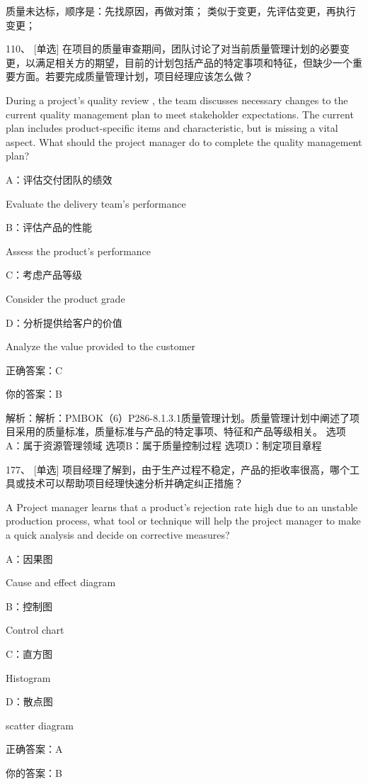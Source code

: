 质量未达标，顺序是：先找原因，再做对策；
类似于变更，先评估变更，再执行变更；



110、 [单选] 在项目的质量审查期间，团队讨论了对当前质量管理计划的必要变更，以满足相关方的期望，目前的计划包括产品的特定事项和特征，但缺少一个重要方面。若要完成质量管理计划，项目经理应该怎么做？

During a project's quality review , the team discusses necessary changes to the current quality management plan to meet stakeholder expectations. The current plan includes product-specific items and characteristic, but is missing a vital aspect. What should the project manager do to complete the quality management plan?

A：评估交付团队的绩效

Evaluate the delivery team's performance

B：评估产品的性能

Assess the product's performance

C：考虑产品等级

Consider the product grade

D：分析提供给客户的价值

Analyze the value provided to the customer

正确答案：C

你的答案：B

解析：解析：PMBOK（6）P286-8.1.3.1质量管理计划。质量管理计划中阐述了项目采用的质量标准，质量标准与产品的特定事项、特征和产品等级相关。 选项A：属于资源管理领域 选项B：属于质量控制过程 选项D：制定项目章程


177、 [单选] 项目经理了解到，由于生产过程不稳定，产品的拒收率很高，哪个工具或技术可以帮助项目经理快速分析并确定纠正措施？

A Project manager learns that a product's rejection rate high due to an unstable production process, what tool or technique will help the project manager to make a quick analysis and decide on corrective measures?

A：因果图

Cause and effect diagram

B：控制图

Control chart

C：直方图

Histogram

D：散点图

scatter diagram

正确答案：A

你的答案：B

